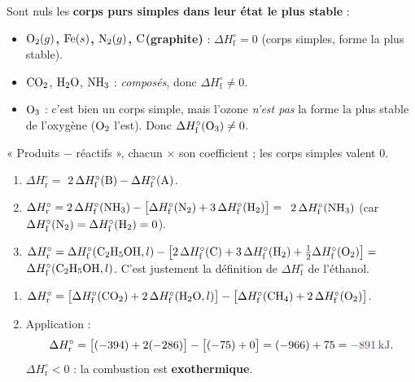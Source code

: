 \documentclass[11pt,a4paper]{article}
\newcommand{\dHr}{\Delta H^{\circ}_{\text{r}}}
\newcommand{\dHf}{\Delta H^{\circ}_{\text{f}}}
\newcommand{\rep}[1]{\textcolor{primarydark}{\textbf{#1}}}
\begin{document}
\begin{center}
\end{center}

\begin{correction}[reconnaître un $\dHf$ nul]
Sont nuls les \textbf{corps purs simples dans leur état le plus stable} :
\begin{itemize}[leftmargin=1.6em,topsep=2pt,itemsep=1pt]
  \item \rep{$\ce{O2}(g)$, $\ce{Fe}(s)$, $\ce{N2}(g)$, $\ce{C}$(graphite)} : $\dHf=0$ (corps simples, forme la plus stable).
  \item $\ce{CO2}$, $\ce{H2O}$, $\ce{NH3}$ : \emph{composés}, donc $\dHf\neq0$.
  \item $\ce{O3}$ : c'est bien un corps simple, mais l'ozone \emph{n'est pas} la forme la plus stable de
        l'oxygène ($\ce{O2}$ l'est). Donc \rep{$\dHf(\ce{O3})\neq0$}.
\end{itemize}
\end{correction}

\begin{correction}
« Produits $-$ réactifs », chacun $\times$ son coefficient ; les corps simples valent $0$.
\begin{enumerate}[label=\alph*),leftmargin=2em,topsep=2pt,itemsep=3pt]
  \item $\dHr ={}$ \rep{$2\,\dHf(\ce{B}) - \dHf(\ce{A})$}.
  \item $\dHr = 2\,\dHf(\ce{NH3}) - \big[\dHf(\ce{N2}) + 3\,\dHf(\ce{H2})\big] ={}$ \rep{$2\,\dHf(\ce{NH3})$}
        (car $\dHf(\ce{N2})=\dHf(\ce{H2})=0$).
  \item $\dHr = \dHf(\ce{C2H5OH},l) - \big[2\,\dHf(\ce{C}) + 3\,\dHf(\ce{H2}) + \tfrac12\dHf(\ce{O2})\big]
        ={}$ \rep{$\dHf(\ce{C2H5OH},l)$}. C'est justement la définition de $\dHf$ de l'éthanol.
\end{enumerate}
\end{correction}

\begin{correction}
\begin{enumerate}[label=\alph*),leftmargin=2em,topsep=2pt,itemsep=2pt]
  \item $\dHr = \big[\dHf(\ce{CO2}) + 2\,\dHf(\ce{H2O},l)\big] - \big[\dHf(\ce{CH4}) + 2\,\dHf(\ce{O2})\big]$.
  \item Application :
  \[ \dHr = \big[(-394) + 2(-286)\big] - \big[(-75) + 0\big] = (-966) + 75 = \rep{\SI{-891}{\kilo\joule}}. \]
  $\dHr<0$ : la combustion est \rep{exothermique}.
\end{enumerate}
\end{correction}
\end{document}

